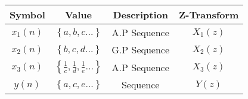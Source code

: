\begin{tabular}{|c|c|c|c|}
    \hline
     \textbf{Symbol} & \textbf{Value} &
     \textbf{Description} & \textbf{Z-Transform} \\
    \hline
     $x_1(n)$ & $\left\{a,b,c...\right\}$ & A.P Sequence &$X_1(z)$\\[6pt]
    \hline
     $x_2(n)$ & $\left\{b,c,d...\right\}$ & G.P Sequence &$X_2(z)$ \\[6pt]
    \hline
     $x_3(n)$ & $\left\{\frac{1}{c}, \frac{1}{d}, \frac{1}{e}...\right\}$
 &  A.P Sequence & $X_3(z)$\\[6pt]
    \hline
     $y(n)$   & $\left\{a,c,e...\right\}$  & Sequence & $Y(z)$\\[6pt]
    \hline
\end{tabular}

